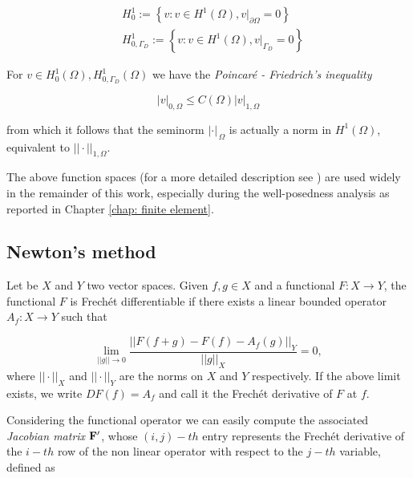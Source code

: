 \begin{align}
& H^1_0 :=  \left\{   v : v \in H^1(\Omega), v|_{\partial \Omega} = 0\right\} \label{space: h1 zero} \\
& H^1_{0,\Gamma_D} :=  \left\{   v : v \in H^1(\Omega), v|_{\Gamma_D} = 0\right\} \label{space: h1 zero gamma}
\end{align} 

For $v \in H^1_0(\Omega),H^1_{0,\Gamma_D}(\Omega)$ we have the \textit{Poincar\'e - Friedrich's inequality} \cite{salsa:EDP}

\begin{equation}
\label{eq: poincarre inequality}
|v|_{0,\Omega} \leq C(\Omega) |v|_{1,\Omega}
\end{equation}

from which it follows that the seminorm $|\cdot |_{\,\Omega}$ is actually a norm in $H^1(\Omega)$, equivalent to $||\cdot ||_{1,\Omega}$.

The above function spaces (for a more detailed description see \cite{Adams:SobolevSpaces}) are used widely in the remainder of this work, especially during the well-posedness analysis as reported in Chapter \ref{chap: finite element}.


\subsection{Newton's method}

\begin{Definizione}
Let be $X$ and $Y$ two vector spaces. Given $f,g \in X$ and a functional $F:X\rightarrow Y$, the functional $F$ is Frech\'et differentiable if there exists a linear bounded operator $A_f:X\rightarrow Y$ such that

\begin{equation}
\lim_{||g||\to 0}\dfrac{||F(f+g)-F(f)-A_f(g)||_Y}{||g||_X} = 0 ,
\end{equation}
where $||\cdot ||_X$ and $||\cdot ||_Y$ are the norms on $X$ and $Y$ respectively.
If the above limit exists, we write $DF(f)=A_f$ and call it the Frech\'et derivative of $F$ at $f$.
\end{Definizione}


Considering the functional operator  we can easily compute the associated \textit{Jacobian matrix} $\mathbf{F}'$, whose $(i,j)-th$ entry represents the Frech\'et derivative of the $i-th$ row of the non linear operator with respect to the $j-th$ variable, defined as

